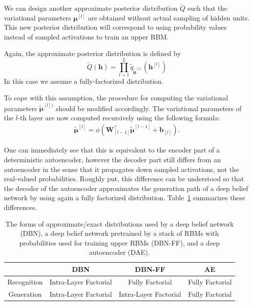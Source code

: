 \documentclass{now}
\newcommand{\qlay}[1]{\left[#1\right]}
\newcommand{\vect}[1]{\mathbf{#1}}
\newcommand{\vects}[1]{\boldsymbol{#1}}
\newcommand{\matr}[1]{\mathbf{#1}}
\newcommand{\vb}[0]{\vect{b}}
\newcommand{\vh}[0]{\vect{h}}
\newcommand{\mW}[0]{\matr{W}}
\newcommand{\vmu}[0]{\vects{\mu}}
\begin{document}
We can design another approximate posterior distribution $\tilde{Q}$ such that
the variational parameters $\vmu^{\qlay{l}}$ are obtained without actual
sampling of hidden units. This new posterior distribution will correspond to
using probability values instead of sampled activations to train an upper RBM.

Again, the approximate posterior distribution is defined by
\[
\tilde{Q}(\vh) = \prod_{l=1}^L \tilde{q}_{\tilde{\vmu}^{\qlay{l}}}\left(
\vh^{\qlay{l}} \right)
\]
In this case we assume a fully-factorized distribution. 

To cope with this assumption, the procedure for computing the variational
parameters $\tilde{\vmu}^{\qlay{l})}$ should be modified accordingly.  The
variational parameters of the $l$-th layer are now computed recursively using
the following formula: 
\begin{align}
    \label{eq:dbn_posterior_ff}
    \tilde{\vmu}^{\qlay{l}} = \phi\left( \mW_{\qlay{l-1}}^\top
    \tilde{\vmu}^{\qlay{l-1}} + \vb_{\qlay{l}} \right).
\end{align}

One can immediately see that this is equivalent to the encoder part of a
deterministic autoencoder, however the decoder part still differs from an
autoencoder in the sense that it propagates down sampled activations, not the
real-valued probabilities.  Roughly put, this difference can be understood so
that the decoder of the autoencoder approximates the generation path of a deep
belief network by using again a fully factorized distribution.
Table~\ref{tbl:dbn_ae} summarizes these differences.

\begin{table}[h]
\vskip 0.15in
    \centering
    \begin{tabular}{c || c | c | c}
        & DBN & DBN-FF & AE \\
        \hline
        \hline
        Recognition & Intra-Layer Factorial & Fully Factorial & Fully Factorial \\
        \hline
        Generation & Intra-Layer Factorial & Intra-Layer Factorial & Fully Factorial \\
    \end{tabular}
    \caption{
        The forms of approximate/exact distributions used by a deep belief
        network (DBN), a deep belief network pretrained by a stack of RBMs with
        probabilities used for training upper RBMs (DBN-FF), and a deep
        autoencoder (DAE).
}
    \label{tbl:dbn_ae}
\end{table}
\end{document}
